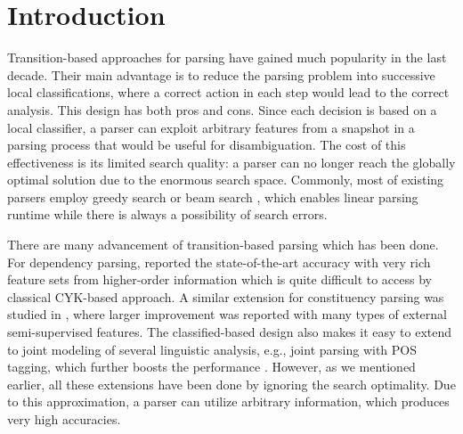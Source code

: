\section {Introduction}
	Transition-based approaches for parsing have gained much popularity in the last decade. Their main advantage is to reduce the parsing problem into successive local classifications, where a correct action in each step would lead to the correct analysis. This design has both pros and cons. Since each decision is based on a local classifier, a parser can exploit arbitrary features from a snapshot in a parsing process that would be useful for disambiguation. The cost of this effectiveness is its limited search quality: a parser can no longer reach the globally optimal solution due to the enormous search space. Commonly, most of existing parsers employ greedy search \cite{NivreAEA03} or beam search \cite{zhang-clark:2009:IWPT09}, which enables linear parsing runtime while there is always a possibility of search errors.
		
	There are many advancement of transition-based parsing which has been done. For dependency parsing,  reported the state-of-the-art accuracy with very rich feature sets from higher-order information which is quite difficult to access by classical CYK-based approach. A similar extension for constituency parsing was studied in , where larger improvement was reported with many types of external semi-supervised features. The classified-based design also makes it easy to extend to joint modeling of several linguistic analysis, e.g., joint parsing with POS tagging, which further boosts the performance \cite{hatori-EtAl:2012:ACL2012,BohnetJMA13,wang-xue:2014:P14-1}. However, as we mentioned earlier, all these extensions have been done by ignoring the search optimality. Due to this approximation, a parser can utilize arbitrary information, which produces very high accuracies.

